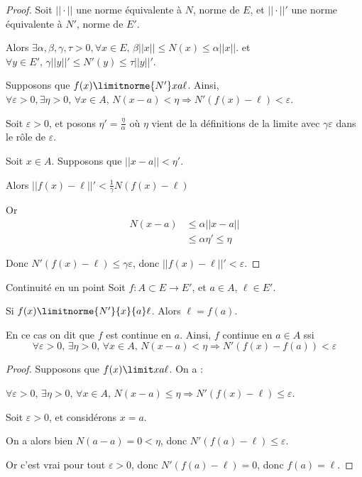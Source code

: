\begin{proof}
    Soit $||\cdot||$ une norme équivalente à $N$, norme de $E$, 
    et $||\cdot||'$ une norme équivalente à $N'$, norme de $E'$.

    Alors $\exists \alpha, \beta, \gamma, \tau > 0, \forall x \in E, \, \beta ||x|| \leqslant N(x) \leqslant \alpha ||x||$.
    et $\forall y \in E', \, \gamma ||y||' \leqslant N'(y) \leqslant \tau ||y||'$.

    Supposons que $f(x) \limitnorme{N'} x a \ell$. Ainsi, $\forall \varepsilon > 0, \exists \eta > 0, \, \forall x \in A, \, N(x - a) < \eta \Rightarrow N'(f(x) - \ell) < \varepsilon$.

    Soit $\varepsilon > 0$, et posons $\eta' = \frac \eta \alpha$ où $\eta$ vient de la 
    définitions de la limite avec $\gamma \varepsilon$ dans le rôle de $\varepsilon$.

    Soit $x \in A$. Supposons que $||x - a|| < \eta'$. 

    Alors $||f(x) - \ell||' < \frac 1 \gamma N(f(x) - \ell)$

    Or \begin{align*}
        N(x - a) & \leqslant \alpha ||x - a|| \\
        & \leqslant \alpha \eta ' \leqslant \eta
    \end{align*}

    Donc $N'(f(x) - \ell) \leqslant \gamma \varepsilon$, donc $||f(x) - \ell||' < \varepsilon$.
\end{proof}

\begin{theoreme}{Continuité en un point}{}
    Soit $f : A \subset E \to E'$, et $a \in A$, $\ell \in E'$. 

    Si $f(x) \limitnorme{N'}{x}{a} \ell$. Alors $\ell = f(a)$.

    En ce cas on dit que $f$ est continue en $a$. Ainsi, $f$ continue en $a \in A$ ssi 
    $$\forall \varepsilon > 0, \, \exists \eta > 0, \, \forall x \in A, \, N(x - a) < \eta \Rightarrow N'(f(x) - f(a)) < \varepsilon$$
\end{theoreme}


\begin{proof}
    Supposons que $f(x) \limit x a \ell$. On a : 

    $\forall \varepsilon > 0, \, \exists \eta > 0, \, \forall x \in A, \, N(x - a) \leqslant \eta \Rightarrow N'(f(x) - \ell) \leqslant \varepsilon$.

    Soit $\varepsilon > 0$, et considérons $x = a$.

    On a alors bien $N(a - a) = 0 < \eta$, donc $N'(f(a) - \ell) \leqslant \varepsilon$.

    Or c'est vrai pour tout $\varepsilon > 0$, donc $N'(f(a) - \ell) = 0$, donc $f(a) = \ell$.
\end{proof}


